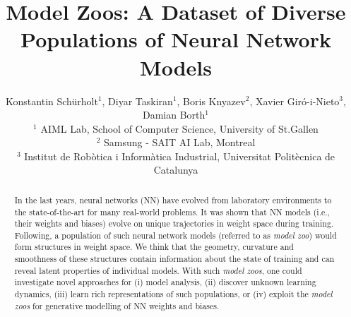 \documentclass{article}
\title{Model Zoos: A Dataset of Diverse Populations of Neural Network Models}
\author{%
{\hspace{-12pt}
Konstantin Sch\"urholt$^1$,  Diyar Taskiran$^1$, Boris Knyazev$^2$, Xavier Giró-i-Nieto$^3$, Damian Borth$^1$
}\\
{
$^1$ AIML Lab, School of Computer Science, University of St.Gallen 
}\\
{
\hspace{-12pt}
$^2$ Samsung - SAIT AI Lab, Montreal 
}\\
{
\hspace{-12pt}
$^3$ Institut de Rob\`otica i Inform\`atica Industrial, Universitat Politècnica de Catalunya 
}\\
}
\begin{document}
\maketitle


%
%
%
%
\begin{abstract}
In the last years, neural networks (NN) have evolved from laboratory environments to the state-of-the-art for many real-world problems. 
It was shown that NN models (i.e., their weights and biases) evolve on unique trajectories in weight space during training. Following, a population of such neural network models (referred to as \textit{model zoo}) would form structures in weight space. We think that the geometry, curvature and smoothness of these structures contain information about the state of training and can reveal latent properties of individual models.
%
With such \textit{model zoos}, one could investigate novel approaches for (i) model analysis, (ii) discover unknown learning dynamics, (iii) learn rich representations of such populations, or (iv) exploit the \textit{model zoos} for generative modelling of NN weights and biases.
%
%

\end{abstract}
\end{document}
